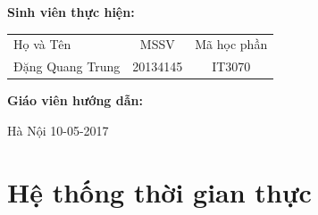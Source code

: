 \documentclass[a4paper,10pt]{report}
\begin{document}
\hspace{1cm}\fontsize{14}{16}\selectfont \textbf{Sinh viên thực hiện:}
\begin{longtable}{l c c }
Họ và Tên & MSSV &    Mã học phần \\[0.5cm]
Đặng Quang Trung &    20134145 & IT3070\\
\end{longtable}
\hspace{0.3cm}\fontsize{14}{16}\selectfont \textbf{Giáo viên hướng dẫn:} \\[1.0cm]
\begin{center}
\fontsize{16}{19}\selectfont Hà Nội 10-05-2017
\end{center} 
\tableofcontents
\chapter{Hệ thống thời gian thực}
\end{document}
